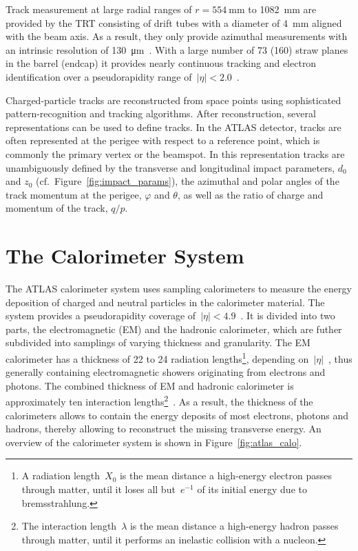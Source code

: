 Track measurement at large radial ranges of $r = \SI{554}{\milli\metre}$ to
\SI{1082}{\milli\metre} are provided by the TRT consisting of drift tubes with a
diameter of \SI{4}{\milli\metre} aligned with the beam axis. As a result, they
only provide azimuthal measurements with an intrinsic resolution of
\SI{130}{\micro\metre}~\cite{atlas_detector}. With a large number of 73 (160)
straw planes in the barrel (endcap) it provides nearly continuous tracking and
electron identification over a pseudorapidity range
of~$|\eta| < 2.0$~\cite{atlas_detector}.

Charged-particle tracks are reconstructed from space points using sophisticated
pattern-recognition and tracking algorithms. After reconstruction, several
representations can be used to define tracks. In the ATLAS detector, tracks are
often represented at the perigee with respect to a reference point, which is
commonly the primary vertex or the beamspot. In this representation tracks are
unambiguously defined by the transverse and longitudinal impact parameters,
$d_0$ and $z_0$ (cf.\ Figure~\ref{fig:impact_params}), the azimuthal and polar
angles of the track momentum at the perigee, $\varphi$ and $\theta$, as well as
the ratio of charge and momentum of the track, $q / p$.


\section{The Calorimeter System}
\label{sec:atlas_calo}

The ATLAS calorimeter system uses sampling calorimeters to measure the energy
deposition of charged and neutral particles in the calorimeter material. The
system provides a pseudorapidity coverage
of~$|\eta| < 4.9$~\cite{atlas_detector}. It is divided into two parts, the
electromagnetic (EM) and the hadronic calorimeter, which are futher subdivided
into samplings of varying thickness and granularity. The EM calorimeter has a
thickness of 22 to 24 radiation lengths\footnote{A radiation length~$X_0$ is the
  mean distance a high-energy electron passes through matter, until it loses all
  but~$e^{-1}$ of its initial energy due to bremsstrahlung.}, depending
on~$|\eta|$~\cite{atlas_detector}, thus generally containing electromagnetic
showers originating from electrons and photons. The combined thickness of EM and
hadronic calorimeter is approximately ten interaction lengths\footnote{The
  interaction length~$\lambda$ is the mean distance a high-energy hadron passes
  through matter, until it performs an inelastic collision with a
  nucleon.}~\cite{atlas_detector}. As a result, the thickness of the
calorimeters allows to contain the energy deposits of most electrons, photons
and hadrons, thereby allowing to reconstruct the missing transverse energy. An
overview of the calorimeter system is shown in Figure~\ref{fig:atlas_calo}.

